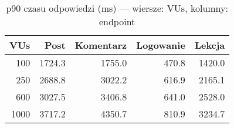 \begin{table}[H]
\centering
\caption{p90 czasu odpowiedzi (ms) — wiersze: VUs, kolumny: endpoint}
\label{tab:p90-vs-vus}
\begin{tabular}{rrrrr}
\toprule
 VUs &   Post &  Komentarz &  Logowanie &  Lekcja \\
\midrule
 100 & 1724.3 &     1755.0 &      470.8 &  1420.0 \\
 250 & 2688.8 &     3022.2 &      616.9 &  2165.1 \\
 600 & 3027.5 &     3406.8 &      641.0 &  2528.0 \\
1000 & 3717.2 &     4350.7 &      810.9 &  3234.7 \\
\bottomrule
\end{tabular}
\end{table}
